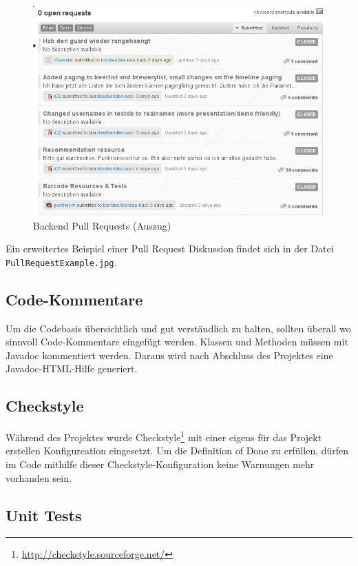 \documentclass[10pt,a4paper]{scrartcl}
\begin{document}
\begin{figure}[H]
	\begin{center}
		\includegraphics[width=\textwidth]{img/github1.png}
	\end{center}
	\caption{Backend Pull Requests (Auszug)}
\end{figure}

Ein erweitertes Beispiel einer Pull Request Diskussion findet sich in der Datei
\texttt{PullRequestExample.jpg}.

\subsection{Code-Kommentare}

Um die Codebasis übersichtlich und gut verständlich zu halten, sollten überall wo sinnvoll
Code-Kommentare eingefügt werden. Klassen und Methoden müssen mit Javadoc kommentiert werden. Daraus
wird nach Abschluss des Projektes eine Javadoc-HTML-Hilfe generiert.

\subsection{Checkstyle}

Während des Projektes wurde Checkstyle\footnote{\url{http://checkstyle.sourceforge.net/}} mit
einer eigens für das Projekt erstellen Konfigureation eingesetzt. Um die Definition of Done zu
erfüllen, dürfen im Code mithilfe dieser Checkstyle-Konfiguration keine Warnungen mehr vorhanden
sein. 

\subsection{Unit Tests}
\end{document}
